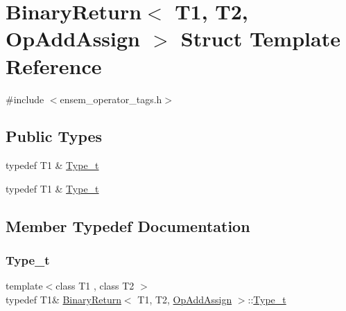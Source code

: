 \hypertarget{structBinaryReturn_3_01T1_00_01T2_00_01OpAddAssign_01_4}{}\section{Binary\+Return$<$ T1, T2, Op\+Add\+Assign $>$ Struct Template Reference}
\label{structBinaryReturn_3_01T1_00_01T2_00_01OpAddAssign_01_4}


{\ttfamily \#include $<$ensem\+\_\+operator\+\_\+tags.\+h$>$}

\subsection*{Public Types}
\begin{DoxyCompactItemize}
\item 
typedef T1 \& \mbox{\hyperlink{structBinaryReturn_3_01T1_00_01T2_00_01OpAddAssign_01_4_ac69ceb90c901b063de9f436ab55169f5}{Type\+\_\+t}}
\item 
typedef T1 \& \mbox{\hyperlink{structBinaryReturn_3_01T1_00_01T2_00_01OpAddAssign_01_4_ac69ceb90c901b063de9f436ab55169f5}{Type\+\_\+t}}
\end{DoxyCompactItemize}


\subsection{Member Typedef Documentation}
\mbox{\label{structBinaryReturn_3_01T1_00_01T2_00_01OpAddAssign_01_4_ac69ceb90c901b063de9f436ab55169f5}} 
\subsubsection{\texorpdfstring{Type\_t}{Type\_t}\hspace{0.1cm}{\footnotesize\ttfamily [1/2]}}
{\footnotesize\ttfamily template$<$class T1 , class T2 $>$ \\
typedef T1\& \mbox{\hyperlink{structBinaryReturn}{Binary\+Return}}$<$ T1, T2, \mbox{\hyperlink{structOpAddAssign}{Op\+Add\+Assign}} $>$\+::\mbox{\hyperlink{structBinaryReturn_3_01T1_00_01T2_00_01OpAddAssign_01_4_ac69ceb90c901b063de9f436ab55169f5}{Type\+\_\+t}}}

